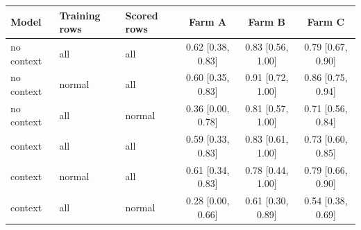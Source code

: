 \begin{tabular}{@{}lllccc@{}}
\toprule
Model & Training rows & Scored rows & Farm A & Farm B & Farm C \\
\midrule
no context & all & all & 0.62 [0.38, 0.83] & 0.83 [0.56, 1.00] & 0.79 [0.67, 0.90] \\
no context & normal & all & 0.60 [0.35, 0.83] & 0.91 [0.72, 1.00] & 0.86 [0.75, 0.94] \\
no context & all & normal & 0.36 [0.00, 0.78] & 0.81 [0.57, 1.00] & 0.71 [0.56, 0.84] \\
context & all & all & 0.59 [0.33, 0.83] & 0.83 [0.61, 1.00] & 0.73 [0.60, 0.85] \\
context & normal & all & 0.61 [0.34, 0.83] & 0.78 [0.44, 1.00] & 0.79 [0.66, 0.90] \\
context & all & normal & 0.28 [0.00, 0.66] & 0.61 [0.30, 0.89] & 0.54 [0.38, 0.69] \\
\bottomrule
\end{tabular}

